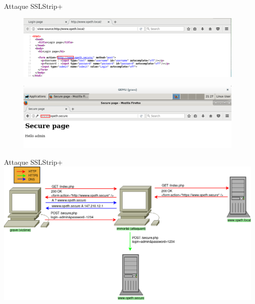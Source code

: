 \begin{frame}{Attaque SSLStrip+}
  \begin{figure}
    \includegraphics[width=1.0\linewidth]{../medias/sslstrip2/screen5-2.png}
  \end{figure}

  \begin{figure}
    \includegraphics[width=1.0\linewidth]{../medias/sslstrip2/screen6.png}
  \end{figure}

\end{frame}


\begin{frame}{Attaque SSLStrip+}
    \includegraphics[width=\linewidth]{../medias/sslstrip2/attack.png}
\end{frame}
